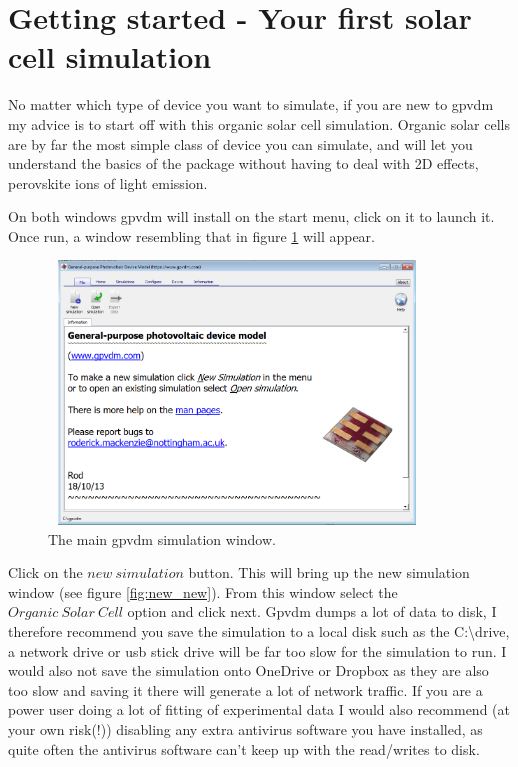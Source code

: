 \newpage
\section{Getting started - Your first solar cell simulation}
No matter which type of device you want to simulate, if you are new to gpvdm my advice is to start off with this organic solar cell simulation. Organic solar cells are by far the most simple class of device you can simulate, and will let you understand the basics of the package without having to deal with 2D effects, perovskite ions of light emission. 

On both windows gpvdm will install on the start menu, click on it to launch it.  Once run, a window resembling that in figure \ref{fig:new_open} will appear.  

\begin{figure}[H]
\centering
\includegraphics[width=100mm,height=70mm]{./images/new_open.png}
\caption{The main gpvdm simulation window.}
\label{fig:new_open}
\end{figure}

Click on the $new~simulation$ button.  This will bring up the new simulation window (see figure \ref{fig:new_new}).  From this window select the $Organic~Solar~Cell$ option and click next.  Gpvdm dumps a lot of data to disk, I therefore recommend you save the simulation to a local disk such as the C:\textbackslash drive, a network drive or usb stick drive will be far too slow for the simulation to run.  I would also not save the simulation onto OneDrive or Dropbox as they are also too slow and saving it there will generate a lot of network traffic.  If you are a power user doing a lot of fitting of experimental data I would also recommend (at your own risk(!)) disabling any extra antivirus software you have installed, as quite often the antivirus software can't keep up with the read/writes to disk.

